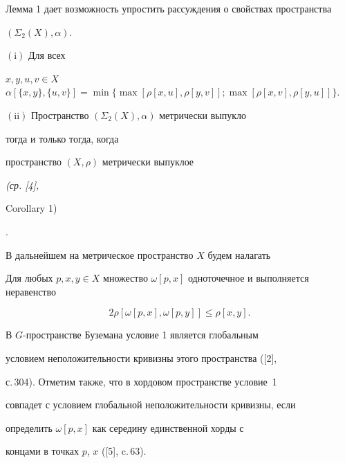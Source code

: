 Лемма 1 дает возможность упростить рассуждения о свойствах пространства


$(\Sigma_{2} (X),\alpha)$.





\begin{lem}





$(\mathrm i)$ Для всех


$x,y,u,v{\in} X$ \ $\alpha [\{x, y\},\{u, v\}]{=}\min \{\max [\rho [x,u],\rho [y,v]];


\max [\rho [x,v],\rho [y,u]]\}$.





$(\mathrm{ii})$ Пространство $(\Sigma_{2} (X),\alpha)$ метрически выпукло


тогда и только тогда, когда


пространство $(X,\rho)$ метрически выпуклое {\em (ср. [4],


Corollary 1)}.


\end{lem}





В дальнейшем на метрическое пространство $X$ будем налагать





\begin{cond}


Для любых $p, x,y \in X$ множество $\omega


[p,x]$ одноточечное и выполняется неравенство


$$


2\rho [\omega [p,x],\omega [p,y]] \leq  \rho[x,y].


$$





В $G$-пространстве Буземана условие 1 является глобальным


условием неположительности кривизны этого пространства ([2],


с.\,304). Отметим также, что в хордовом пространстве условие~1


совпадет с условием глобальной неположительности кривизны, если


определить $\omega [p,x]$ как середину единственной хорды с


концами в точках $p$, $x$  ([5], c.\,63). 


\end{cond}





